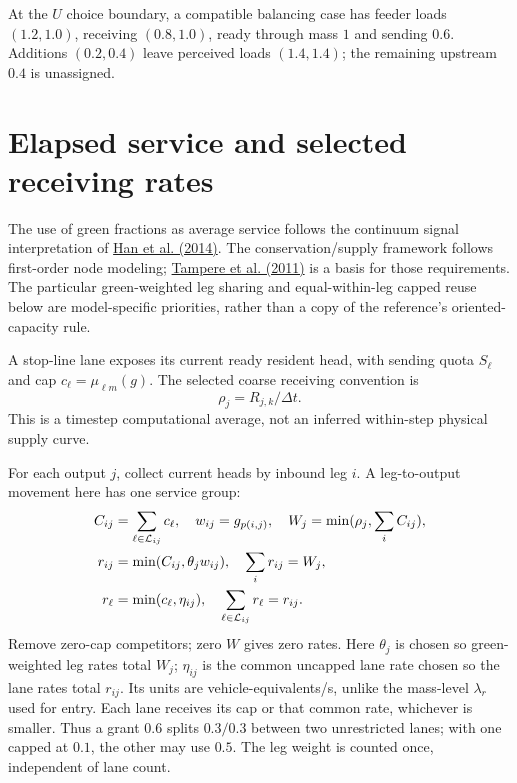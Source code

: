 \documentclass[10pt,a4paper]{article}
\newenvironment{revision}{\begingroup\color{revisionred}}{\par\endgroup}
\begin{document}
At the $U$ choice boundary, a compatible balancing case has feeder loads
$(1.2,1.0)$, receiving $(0.8,1.0)$, ready through mass $1$ and sending $0.6$.
Additions $(0.2,0.4)$ leave perceived loads $(1.4,1.4)$;
the remaining upstream $0.4$ is unassigned.

\section{Elapsed service and selected receiving rates}

\begin{revision}
The use of green fractions as average service follows the continuum
signal interpretation of
\href{https://arxiv.org/abs/1309.3461}{Han et al. (2014)}.
The conservation/supply framework follows first-order node modeling;
\href{https://doi.org/10.1016/j.trb.2010.06.004}{Tampere et al. (2011)}
is a basis for those requirements. The particular green-weighted leg
sharing and equal-within-leg capped reuse below are model-specific
priorities, rather than a copy of the reference's oriented-capacity rule.
\end{revision}

A stop-line lane exposes its current ready resident head, with sending
quota $S_\ell$ and cap $c_\ell=\mu_{\ell m}(g)$.
The selected coarse receiving convention is
\begin{equation}
 \rho_j=R_{j,k}/\Delta t .
 \label{eq:receiving-rate}
\end{equation}
This is a timestep computational average, not an inferred within-step
physical supply curve.

For each output $j$, collect current heads by inbound leg $i$.
A leg-to-output movement here has one service group:
\begin{align}
 C_{ij}&=\sum_{\ell\in{\cal L}_{ij}}c_\ell,\quad
 w_{ij}=g_{p(i,j)},\quad W_j=\min(\rho_j,\sum_iC_{ij}),\nonumber\\
 r_{ij}&=\min(C_{ij},\theta_jw_{ij}),\quad
                    \sum_i r_{ij}=W_j,\label{eq:leg-sharing}\\
 r_\ell&=\min(c_\ell,\eta_{ij}),\quad
                    \sum_{\ell\in{\cal L}_{ij}}r_\ell=r_{ij}.
 \label{eq:lane-sharing}
\end{align}
Remove zero-cap competitors; zero $W$ gives zero rates.
\begin{revision}
Here $\theta_j$ is chosen so green-weighted leg rates total $W_j$;
$\eta_{ij}$ is the common uncapped lane rate chosen so the lane rates
total $r_{ij}$. Its units are vehicle-equivalents/s, unlike the mass-level
$\lambda_r$ used for entry. Each lane receives its cap or that common
rate, whichever is smaller. Thus a grant $0.6$ splits $0.3/0.3$ between
two unrestricted lanes; with one capped at $0.1$, the other may use $0.5$.
The leg weight is counted once, independent of lane count.
\end{revision}
\end{document}
